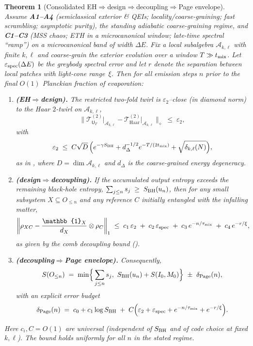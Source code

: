 \documentclass[a4paper,11pt]{article}
\newcommand{\mathbbm}[1]{\mathbb{#1}}
\let\mathscr\mathcal
\theoremstyle{plain}
\newtheorem{theorem}{Theorem}
\theoremstyle{definition}
\theoremstyle{remark}
\begin{document}
\begin{theorem}[Consolidated EH$\Rightarrow$design$\Rightarrow$decoupling$\Rightarrow$Page envelope]\label{thm:eh2design2page}
Assume \textbf{A1--A4} (\emph{semiclassical exterior \& QEIs; locality/coarse-graining; fast scrambling; asymptotic purity}),
the standing adiabatic coarse-graining regime,
and \textbf{C1--C3} (\emph{MSS chaos; ETH in a microcanonical window; late-time spectral ``ramp''})
on a microcanonical band of width $\Delta E$.  Fix a local subalgebra $\mathscr{A}_{k,\ell}$ with finite $k,\ell$ and coarse-grain the exterior evolution over a window $T\gg t_{\rm mix}$.
Let $\varepsilon_{\rm spec}(\Delta E)$ be the greybody spectral error and let $r$ denote the separation between local patches with light-cone range~$\xi$.
Then for all emission steps $n$ prior to the final $O(1)$ Planckian fraction of evaporation:
\begin{enumerate}[leftmargin=*]
\item \textbf{(EH$\Rightarrow$design).} The restricted two-fold twirl is $\varepsilon_2$--close (in diamond norm) to the Haar $2$-twirl on $\mathscr{A}_{k,\ell}$,
\[
\Big\| \mathcal{T}^{(2)}_{\mathsf{U}_T}\big|_{\mathscr{A}_{k,\ell}} - \mathcal{T}^{(2)}_{\mathrm{Haar}}\big|_{\mathscr{A}_{k,\ell}} \Big\|_\diamond \;\le\; \varepsilon_2,
\]
with
\[
\varepsilon_2 \;\le\; C \sqrt{D}\,\Big( e^{-\gamma S_{\rm BH}} + d_\Delta^{-1/2} e^{-T/(2t_{\rm mix})} + \sqrt{\delta_{k,\ell}(N)} \Big),
\]
as in , where $D=\dim \mathscr{A}_{k,\ell}$ and $d_\Delta$ is the coarse-grained energy degeneracy.

\item \textbf{(design$\Rightarrow$decoupling).} If the accumulated output entropy exceeds the remaining black-hole entropy,
$\sum_{j\le n} s_j \;\ge\; S_{\rm BH}(u_n)$,
then for any small subsystem $X\subseteq O_{\le n}$ and any reference $C$ initially entangled with the infalling matter,
\[
\left\|\rho_{XC}-\frac{\mathbbm{1}_X}{d_X}\otimes\rho_C\right\|_1 \;\le\; c_1\,\varepsilon_2 \;+\; c_2\,\varepsilon_{\rm spec} \;+\; c_3\,e^{-n/\tau_{\rm mix}} \;+\; c_4\,e^{-r/\xi},
\]
as given by the comb decoupling bound ().

\item \textbf{(decoupling$\Rightarrow$Page envelope).} Consequently,
\[
S(O_{\le n}) \;=\; \min\!\Big\{\sum_{j\le n} s_j,\ S_{\rm BH}(u_n)+S(I_0,M_0)\Big\} \ \pm\ \delta_{\rm Page}(n),
\]
with an explicit error budget
\[
\delta_{\rm Page}(n)\;=\; c_0 + c_1\log S_{\rm BH} \;+\; C\Big(\varepsilon_2 + \varepsilon_{\rm spec} + e^{-n/\tau_{\rm mix}} + e^{-r/\xi}\Big).
\]
\end{enumerate}
Here $c_i,C=O(1)$ are universal (independent of $S_{\rm BH}$ and of code choice at fixed $k,\ell$).  The bound holds uniformly for all $n$ in the stated regime.
\end{theorem}
\end{document}
